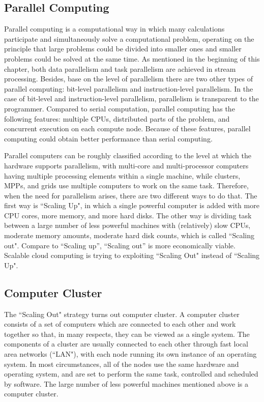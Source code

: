 \subsection{Parallel Computing}
\label{subsection:parallel_computing}
Parallel computing is a computational way in which many calculations participate and simultaneously solve a computational problem, operating on the principle that large problems could be divided into smaller ones and smaller problems could be solved at the same time. As mentioned in the beginning of this chapter, both data parallelism and task parallelism are achieved in stream processing. Besides, base on the level of parallelism there are two other types of parallel computing: bit-level parallelism and instruction-level parallelism. In the case of bit-level and instruction-level parallelism, parallelism is transparent to the programmer. Compared to serial computation, parallel computing has the following features: multiple CPUs, distributed parts of the problem, and concurrent execution on each compute node. Because of these features, parallel computing could obtain better performance than serial computing. 

Parallel computers can be roughly classified according to the level at which the hardware supports parallelism, with multi-core and multi-processor computers having multiple processing elements within a single machine, while clusters, MPPs, and grids use multiple computers to work on the same task. Therefore, when the need for parallelism arises, there are two different ways to do that. The first way is ``Scaling Up", in which a single powerful computer is added with more CPU cores, more memory, and more hard disks. The other way is dividing task between a large number of less powerful machines with (relatively) slow CPUs, moderate memory amounts, moderate hard disk counts, which is called ``Scaling out". Compare to ``Scaling up'', ``Scaling out'' is more economically viable. Scalable cloud computing is trying to exploiting ``Scaling Out" instead of ``Scaling Up".

\subsection{Computer Cluster}
\label{subsection:computing_cluster}
The ``Scaling Out" strategy turns out computer cluster. A computer cluster consists of a set of computers which are connected to each other and work together so that, in many respects, they can be viewed as a single system. The components of a cluster are usually connected to each other through fast local area networks (``LAN"), with each node running its own instance of an operating system. In most circumstances, all of the nodes use the same hardware and operating system, and are set to perform the same task, controlled and scheduled by software. The large number of less powerful machines mentioned above is a computer cluster.

